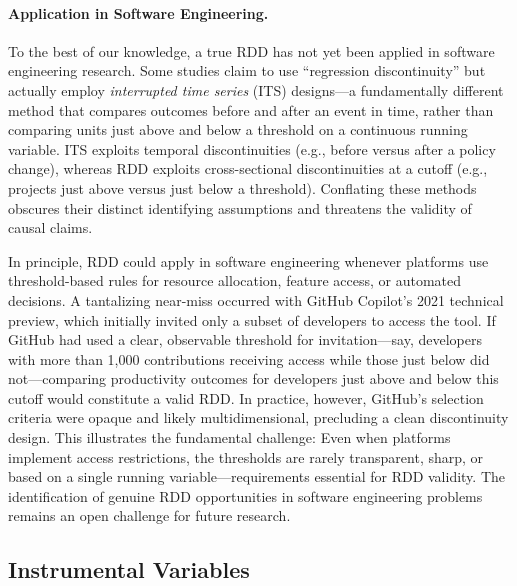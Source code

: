 \paragraph{Application in Software Engineering.}
To the best of our knowledge, a true RDD has not yet been applied in software engineering research.
Some studies claim to use ``regression discontinuity'' but actually employ \emph{interrupted time series} (ITS) designs---a fundamentally different method that compares outcomes before and after an event in time, rather than comparing units just above and below a threshold on a continuous running variable.
ITS exploits temporal discontinuities (e.g., before versus after a policy change), whereas RDD exploits cross-sectional discontinuities at a cutoff (e.g., projects just above versus just below a threshold).
Conflating these methods obscures their distinct identifying assumptions and threatens the validity of causal claims.

In principle, RDD could apply in software engineering whenever platforms use threshold-based rules for resource allocation, feature access, or automated decisions.
A tantalizing near-miss occurred with GitHub Copilot's 2021 technical preview, which initially invited only a subset of developers to access the tool.
If GitHub had used a clear, observable threshold for invitation---say, developers with more than 1,000 contributions receiving access while those just below did not---comparing productivity outcomes for developers just above and below this cutoff would constitute a valid RDD.
In practice, however, GitHub's selection criteria were opaque and likely multidimensional, precluding a clean discontinuity design.
This illustrates the fundamental challenge: Even when platforms implement access restrictions, the thresholds are rarely transparent, sharp, or based on a single running variable---requirements essential for RDD validity.
The identification of genuine RDD opportunities in software engineering problems remains an open challenge for future research.

\subsection{Instrumental Variables}

